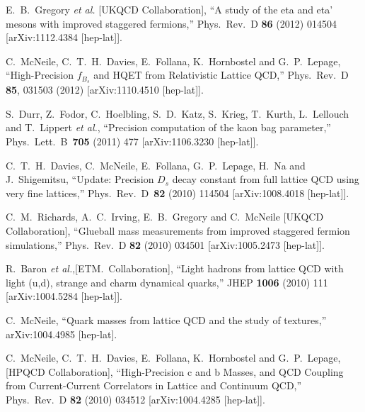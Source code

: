 \begin{thebibliography}{130}
  E.~B.~Gregory {\it et al.}  [UKQCD Collaboration],
  ``A study of the eta and eta' mesons with improved staggered
  fermions,''
  Phys.\ Rev.\ D {\bf 86} (2012) 014504
  [arXiv:1112.4384 [hep-lat]].

  C.~McNeile, C.~T.~H.~Davies, E.~Follana, K.~Hornbostel and
  G.~P.~Lepage,
  ``High-Precision $f_{B_s}$ and HQET from Relativistic Lattice
  QCD,''
  Phys.\ Rev.\ D {\bf 85}, 031503 (2012)
  [arXiv:1110.4510 [hep-lat]].




  S.~Durr, Z.~Fodor, C.~Hoelbling, S.~D.~Katz, S.~Krieg, T.~Kurth,
  L.~Lellouch and T.~Lippert {\it et al.},
  ``Precision computation of the kaon bag parameter,''
  Phys.\ Lett.\ B\ {\bf 705} (2011) 477
  [arXiv:1106.3230 [hep-lat]].

  C.~T.~H.~Davies, C.~McNeile, E.~Follana, G.~P.~Lepage, H.~Na and
  J.~Shigemitsu,
  ``Update: Precision $D_s$ decay constant from full lattice QCD
  using very fine lattices,''
  Phys.\ Rev.\ D\ {\bf 82} (2010) 114504
  [arXiv:1008.4018 [hep-lat]].

  C.~M.~Richards, A.~C.~Irving, E.~B.~Gregory and C.~McNeile  [UKQCD
                  Collaboration],
  ``Glueball mass measurements from improved staggered fermion
  simulations,''
  Phys.\ Rev.\  D {\bf 82} (2010) 034501
  [arXiv:1005.2473 [hep-lat]].


  R.~Baron {\it et al.},[ETM.~Collaboration],
  ``Light hadrons from lattice QCD with light (u,d), strange and
  charm
  dynamical quarks,''
  JHEP {\bf 1006} (2010) 111
  [arXiv:1004.5284 [hep-lat]].



  C.~McNeile,
  ``Quark masses from lattice QCD and the study of textures,''
  arXiv:1004.4985 [hep-lat].

  C.~McNeile, C.~T.~H.~Davies, E.~Follana, K.~Hornbostel and
  G.~P.~Lepage, [HPQCD Collaboration],
  ``High-Precision c and b Masses, and QCD Coupling from
  Current-Current
  Correlators in Lattice and Continuum QCD,''
  Phys.\ Rev.\  D {\bf 82} (2010) 034512
  [arXiv:1004.4285 [hep-lat]].


\end{thebibliography}
